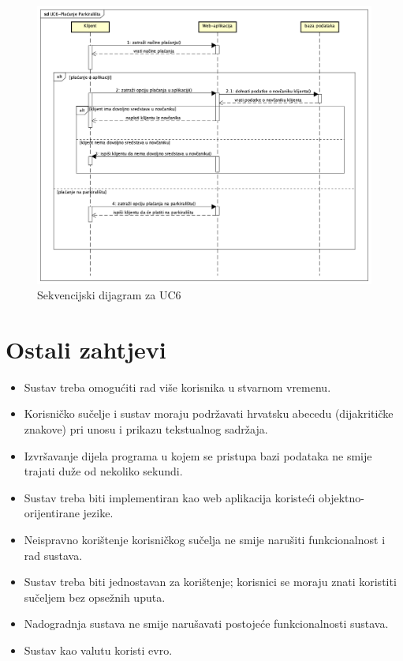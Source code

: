 				      \begin{figure}[hbt!]
				      	\centering
				      	\includegraphics[width=0.7\linewidth]{slike/UC6.png}
				      	\caption{Sekvencijski dijagram za UC6}
				      	\label{fig:uc6}
				      \end{figure}
				      
				    
				    
				    
		   	\eject
	
		\section{Ostali zahtjevi}
		
			\begin{itemize}
				\item Sustav treba omogućiti rad više korisnika u stvarnom vremenu.
				\item Korisničko sučelje i sustav moraju podržavati hrvatsku abecedu (dijakritičke znakove) pri unosu i prikazu tekstualnog sadržaja.
				\item Izvršavanje dijela programa u kojem se pristupa bazi podataka ne smije trajati duže od nekoliko sekundi.
				\item Sustav treba biti implementiran kao web aplikacija koristeći objektno-orijentirane jezike.
				\item Neispravno korištenje korisničkog sučelja ne smije narušiti funkcionalnost i rad sustava.
				\item Sustav treba biti jednostavan za korištenje; korisnici se moraju znati koristiti sučeljem bez opsežnih uputa.
				\item Nadogradnja sustava ne smije narušavati postojeće funkcionalnosti sustava.
				\item Sustav kao valutu koristi evro. 
			\end{itemize}
			 
			 
			 
	